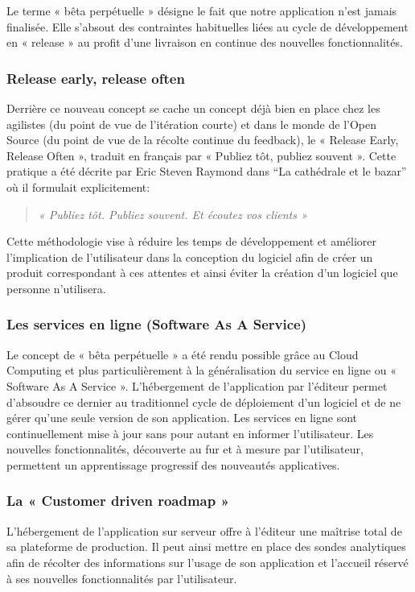     Le terme « bêta perpétuelle » désigne le fait que notre application n’est jamais finalisée. Elle s’absout des contraintes habituelles liées au cycle de développement en « release » au profit d’une livraison en continue des nouvelles fonctionnalités.

      \subsubsection{Release early, release often}
      Derrière ce nouveau concept se cache un concept déjà bien en place chez les agilistes (du point de vue de l’itération courte) et dans le monde de l’Open Source (du point de vue de la récolte continue du feedback), le « Release Early, Release Often », traduit en français par « Publiez tôt, publiez souvent ». Cette pratique a été décrite par Eric Steven Raymond dans “La cathédrale et le bazar” où il formulait explicitement:\\
      \begin{quotation}
        \emph{« Publiez tôt. Publiez souvent. Et écoutez vos clients »}\\
      \end{quotation}

      Cette méthodologie vise à réduire les temps de développement et améliorer l’implication de l’utilisateur dans la conception du logiciel afin de créer un produit correspondant à ces attentes et ainsi éviter la création d’un logiciel que personne n’utilisera.

      \subsubsection{Les services en ligne (Software As A Service)}
      Le concept de « bêta perpétuelle » a été rendu possible grâce au Cloud Computing et plus particulièrement à la généralisation du service en ligne ou « Software As A Service ». L’hébergement de l’application par l’éditeur permet d’absoudre ce dernier au traditionnel cycle de déploiement d’un logiciel et de ne gérer qu’une seule version de son application. Les services en ligne sont continuellement mise à jour sans pour autant en informer l’utilisateur. Les nouvelles fonctionnalités, découverte au fur et à mesure par l’utilisateur, permettent un apprentissage progressif des nouveautés applicatives.

      \subsubsection{La « Customer driven roadmap »}
      L’hébergement de l’application sur serveur offre à l’éditeur une maîtrise total de sa plateforme de production. Il peut ainsi mettre en place des sondes analytiques afin de récolter des informations sur l’usage de son application et l’accueil réservé à ses nouvelles fonctionnalités par l’utilisateur.

